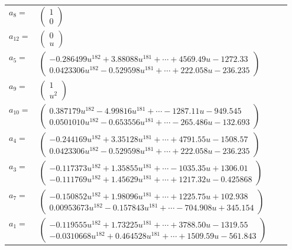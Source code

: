 \documentclass[1p]{elsarticle_modified}
\theoremstyle{definition}
\begin{document}
\begin{tabular}{m{7pt} m{180pt} m{7pt} m{180pt} }
\flushright $a_{8}=$&$\begin{pmatrix}1\\0\end{pmatrix}$ \\
\flushright $a_{12}=$&$\begin{pmatrix}0\\u\end{pmatrix}$ \\
\flushright $a_{5}=$&$\begin{pmatrix}-0.286499 u^{182}+3.88088 u^{181}+\cdots+4569.49 u-1272.33\\0.0423306 u^{182}-0.529598 u^{181}+\cdots+222.058 u-236.235\end{pmatrix}$ \\
\flushright $a_{9}=$&$\begin{pmatrix}1\\u^2\end{pmatrix}$ \\
\flushright $a_{10}=$&$\begin{pmatrix}0.387179 u^{182}-4.99816 u^{181}+\cdots-1287.11 u-949.545\\0.0501010 u^{182}-0.653556 u^{181}+\cdots-265.486 u-132.693\end{pmatrix}$ \\
\flushright $a_{4}=$&$\begin{pmatrix}-0.244169 u^{182}+3.35128 u^{181}+\cdots+4791.55 u-1508.57\\0.0423306 u^{182}-0.529598 u^{181}+\cdots+222.058 u-236.235\end{pmatrix}$ \\
\flushright $a_{3}=$&$\begin{pmatrix}-0.117373 u^{182}+1.35855 u^{181}+\cdots-1035.35 u+1306.01\\-0.111769 u^{182}+1.45629 u^{181}+\cdots+1217.32 u-0.425868\end{pmatrix}$ \\
\flushright $a_{7}=$&$\begin{pmatrix}-0.150852 u^{182}+1.98096 u^{181}+\cdots+1225.75 u+102.938\\0.00953673 u^{182}-0.157843 u^{181}+\cdots-704.908 u+345.154\end{pmatrix}$ \\
\flushright $a_{1}=$&$\begin{pmatrix}-0.119555 u^{182}+1.73225 u^{181}+\cdots+3788.50 u-1319.55\\-0.0310668 u^{182}+0.464528 u^{181}+\cdots+1509.59 u-561.843\end{pmatrix}$ \\

\end{tabular}
\end{document}
